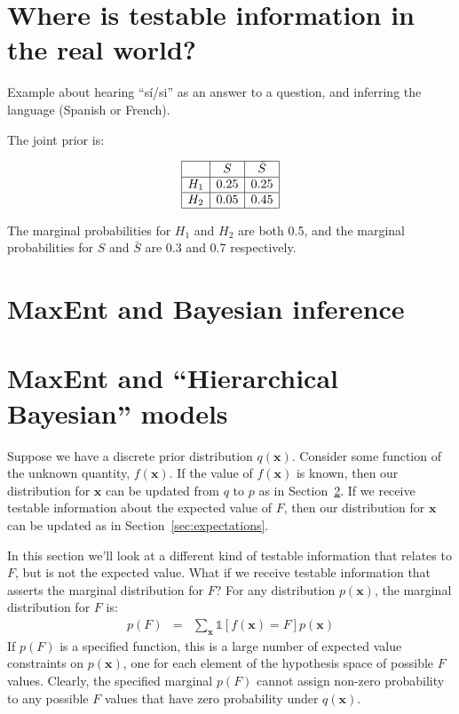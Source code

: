 \documentclass[letterpaper, 11pt]{article}
\newcommand{\xx}{\boldsymbol{x}}
\begin{document}
\section{Where is testable information in the real world?}

Example about hearing ``sí/si'' as an answer to a question,
and inferring the language (Spanish or French).

The joint prior is:

\begin{eqnarray}
\begin{array}{|c|c|c|}
\hline
	&	S	& \bar{S}\\
\hline
H_1 & 0.25  & 0.25\\
\hline
H_2 & 0.05 & 0.45\\
\hline
\end{array}
\end{eqnarray}

The marginal probabilities for $H_1$ and $H_2$ are both 0.5, and the
marginal probabilities for $S$ and $\bar{S}$ are 0.3 and 0.7 respectively.


\section{MaxEnt and Bayesian inference}\label{sec:bayes}

\section{MaxEnt and ``Hierarchical Bayesian'' models}
Suppose we have a discrete prior distribution $q(\xx)$. Consider some
function of the unknown quantity, $f(\xx)$.
If the value of $f(\xx)$ is known, then our distribution for $\xx$ can
be updated from $q$ to $p$ as in Section~\ref{sec:bayes}.
If we receive testable information
about the expected value of $F$, then our distribution for $\xx$ can
be updated as in Section~\ref{sec:expectations}.

In this section we'll look at a different kind of testable information that
relates to $F$, but is not the expected value. What if we receive testable
information that asserts the marginal distribution for $F$?
For any distribution $p(\xx)$, the marginal distribution for $F$ is:
\begin{eqnarray}
p(F) &=& \sum_{\xx}\mathds{1}\left[f(\xx) = F\right]p(\xx)\label{eqn:constraint}
\end{eqnarray}
If $p(F)$ is a specified function, this is a large number of expected
value constraints on $p(\xx)$, one for each element of the hypothesis space
of possible $F$ values. Clearly, the specified marginal $p(F)$ cannot assign
non-zero probability to any possible $F$ values that have zero probability
under $q(\xx)$.
\end{document}
